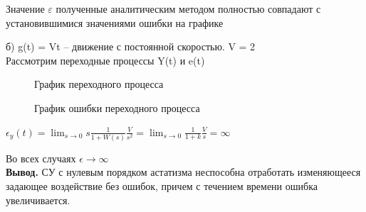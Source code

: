 \documentclass[a4paper, 11pt]{article}
\begin{document}
Значение $\varepsilon$ полученные аналитическим методом полностью совпадают с установившимися значениями ошибки на графике

\newpage
б) g(t) = Vt – движение с постоянной скоростью. V = 2\\

Рассмотрим переходные процессы Y(t) и e(t)

\begin{figure}[h!]
    \caption{График переходного процесса}
    \label{four}
\end{figure}

\begin{figure}[h!]
    \caption{График ошибки переходного процесса}
    \label{tree}
\end{figure}

$\epsilon_y(t)=\lim_{s\to0}s\frac{1}{1+W(s)}\frac{V}{s^2}=\lim_{s\to0}\frac{1}{1+k}\frac{V}{s}=\infty$

Во всех случаях $\epsilon\to\infty$ \\

\textbf{Вывод.} СУ с нулевым порядком астатизма неспособна отработать изменяющееся задающее воздействие без ошибок, причем с течением времени ошибка увеличивается.
\newpage
\end{document}
